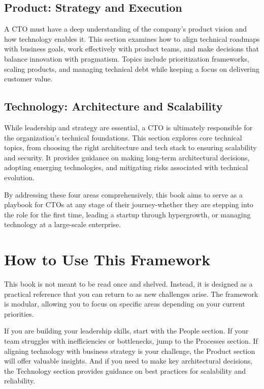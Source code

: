 \subsection{Product: Strategy and Execution}

A CTO must have a deep understanding of the company's product vision and how technology enables it. This section examines how to align technical roadmaps with business goals, work effectively with product teams, and make decisions that balance innovation with pragmatism. Topics include prioritization frameworks, scaling products, and managing technical debt while keeping a focus on delivering customer value.

\subsection{Technology: Architecture and Scalability}

While leadership and strategy are essential, a CTO is ultimately responsible for the organization's technical foundations. This section explores core technical topics, from choosing the right architecture and tech stack to ensuring scalability and security. It provides guidance on making long-term architectural decisions, adopting emerging technologies, and mitigating risks associated with technical evolution.

By addressing these four areas comprehensively, this book aims to serve as a playbook for CTOs at any stage of their journey-whether they are stepping into the role for the first time, leading a startup through hypergrowth, or managing technology at a large-scale enterprise.

\section{How to Use This Framework}

This book is not meant to be read once and shelved. Instead, it is designed as a practical reference that you can return to as new challenges arise. The framework is modular, allowing you to focus on specific areas depending on your current priorities.

If you are building your leadership skills, start with the People section. If your team struggles with inefficiencies or bottlenecks, jump to the Processes section. If aligning technology with business strategy is your challenge, the Product section will offer valuable insights. And if you need to make key architectural decisions, the Technology section provides guidance on best practices for scalability and reliability.


